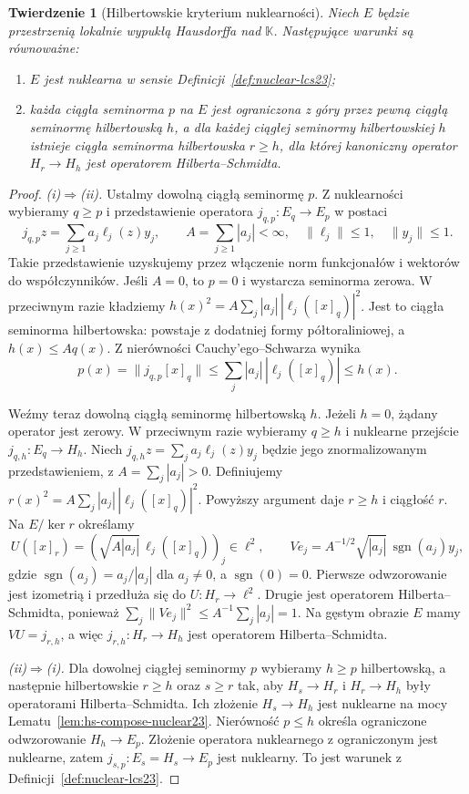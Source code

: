 \documentclass[11pt,a4paper]{article}
\numberwithin{equation}{section}
\theoremstyle{plain}
\newtheorem{twierdzenie}{Twierdzenie}[section]
\theoremstyle{definition}
\theoremstyle{remark}
\newcommand{\K}{\mathbb K}
\begin{document}
\begin{twierdzenie}[Hilbertowskie kryterium nuklearności]
\label{thm:hilbert-nuclear23}
Niech $E$ będzie przestrzenią lokalnie wypukłą Hausdorffa
nad $\K$. Następujące warunki są równoważne:
\begin{enumerate}[label=\textup{(\roman*)},leftmargin=*]
\item $E$ jest nuklearna w sensie
Definicji~\ref{def:nuclear-lcs23};
\item każda ciągła seminorma $p$ na $E$ jest ograniczona
z góry przez pewną ciągłą seminormę hilbertowską $h$,
a dla każdej ciągłej seminormy hilbertowskiej $h$ istnieje
ciągła seminorma hilbertowska $r\ge h$, dla której
kanoniczny operator $H_r\to H_h$ jest operatorem
Hilberta--Schmidta.
\end{enumerate}
\end{twierdzenie}
\begin{proof}
\emph{(i)$\Rightarrow$(ii).} Ustalmy dowolną ciągłą seminormę $p$.
Z nuklearności wybieramy $q\ge p$ i przedstawienie operatora
$j_{q,p}:E_q\to E_p$ w postaci
\[
 j_{q,p}z=\sum_{j\ge1}a_j\ell_j(z)y_j,\qquad
 A=\sum_{j\ge1}|a_j|<\infty,\quad
 \|\ell_j\|\le1,\quad\|y_j\|\le1.
\]
Takie przedstawienie uzyskujemy przez włączenie norm funkcjonałów
i wektorów do współczynników. Jeśli $A=0$, to $p=0$ i wystarcza
seminorma zerowa. W przeciwnym razie kładziemy
$h(x)^2=A\sum_j|a_j|\,|\ell_j([x]_q)|^2$.
Jest to ciągła seminorma hilbertowska: powstaje z dodatniej
formy półtoraliniowej, a $h(x)\le Aq(x)$.
Z nierówności Cauchy'ego--Schwarza wynika
\[
 p(x)=\bigl\|j_{q,p}[x]_q\bigr\|
 \le\sum_j|a_j|\,|\ell_j([x]_q)|
 \le h(x).
\]

Weźmy teraz dowolną ciągłą seminormę hilbertowską $h$.
Jeżeli $h=0$, żądany operator jest zerowy. W przeciwnym razie
wybieramy $q\ge h$ i nuklearne przejście $j_{q,h}:E_q\to H_h$.
Niech $j_{q,h}z=\sum_ja_j\ell_j(z)y_j$ będzie jego
znormalizowanym przedstawieniem, z $A=\sum_j|a_j|>0$.
Definiujemy $r(x)^2=A\sum_j|a_j|\,|\ell_j([x]_q)|^2$.
Powyższy argument daje $r\ge h$ i ciągłość $r$.
Na $E/\ker r$ określamy
\[
 U([x]_r)=(\sqrt{A|a_j|}\,\ell_j([x]_q))_j\in\ell^2,
\qquad
 Ve_j=A^{-1/2}\sqrt{|a_j|}\,\operatorname{sgn}(a_j)y_j,
\]
gdzie $\operatorname{sgn}(a_j)=a_j/|a_j|$ dla $a_j\ne0$,
a $\operatorname{sgn}(0)=0$. Pierwsze odwzorowanie jest
izometrią i przedłuża się do $U:H_r\to\ell^2$.
Drugie jest operatorem Hilberta--Schmidta, ponieważ
$\sum_j\|Ve_j\|^2\le A^{-1}\sum_j|a_j|=1$.
Na gęstym obrazie $E$ mamy $VU=j_{r,h}$, a więc
$j_{r,h}:H_r\to H_h$ jest operatorem Hilberta--Schmidta.

\emph{(ii)$\Rightarrow$(i).} Dla dowolnej ciągłej seminormy
$p$ wybieramy $h\ge p$ hilbertowską, a następnie
hilbertowskie $r\ge h$ oraz $s\ge r$ tak, aby
$H_s\to H_r$ i $H_r\to H_h$ były operatorami
Hilberta--Schmidta. Ich złożenie $H_s\to H_h$ jest
nuklearne na mocy Lematu~\ref{lem:hs-compose-nuclear23}.
Nierówność $p\le h$ określa ograniczone odwzorowanie
$H_h\to E_p$. Złożenie operatora nuklearnego z ograniczonym
jest nuklearne, zatem $j_{s,p}:E_s=H_s\to E_p$ jest
nuklearny. To jest warunek z Definicji~\ref{def:nuclear-lcs23}.
\end{proof}
\end{document}
